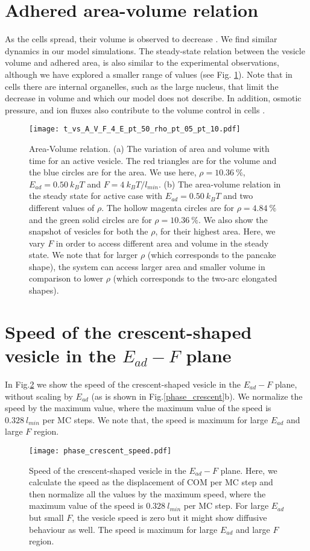 \documentclass[pre,amsmath]{revtex4}
\begin{document}
\section{Adhered area-volume relation}
\label{sec:volume}
As the cells spread, their volume is observed to decrease \cite{guo2017cell,xie2018controlling}. We find similar dynamics in our model simulations. The steady-state relation between the vesicle volume and adhered area, is also similar to the experimental observations, although we have explored a smaller range of values (see Fig. \ref{area_volume}). Note that in cells there are internal organelles, such as the large nucleus, that limit the decrease in volume and which our model does not describe. In addition, osmotic pressure, and ion fluxes also contribute to the volume control in cells \cite{adar2020active}. 
\begin{figure}[ht]
\centering
\texttt{[image: t\_vs\_A\_V\_F\_4\_E\_pt\_50\_rho\_pt\_05\_pt\_10.pdf]}
\caption{Area-Volume relation. (a) The variation of area and volume with time for an active vesicle. The red triangles are for the volume and the blue circles are for the area. We use here, $\rho=10.36 ~\%$, $E_{ad}=0.50 ~k_B T$ and $F=4 ~k_B T /l_{min}$. (b) The area-volume relation in the steady state for active case with $E_{ad}=0.50~ k_B T$ and two different values of $\rho$. The hollow magenta circles are for $\rho=4.84 ~\%$ and the green solid circles are for $\rho=10.36 ~\%$. We also show the snapshot of vesicles for both the $\rho$, for their highest area. Here, we vary $F$ in order to access different area and volume in the steady state.  We note that for larger $\rho$ (which corresponds to the pancake shape), the system can access larger area and smaller volume in comparison to lower $\rho$ (which corresponds to the two-arc elongated shapes).}
\label{area_volume} 
\end{figure}

\section{Speed of the crescent-shaped vesicle in the $E_{ad}-F$ plane }
\label{sec:crescent_speed}
In Fig.\ref{crescent_speed} we show the speed of the crescent-shaped vesicle in the $E_{ad}-F$ plane, without scaling by $E_{ad}$ (as is shown in Fig.\ref{phase_crescent}b). We normalize the speed by the maximum value, where the maximum value of the speed is $0.328 ~ l_{min}$ per MC steps. We note that, the speed is maximum for large $E_{ad}$ and large $F$ region.
\begin{figure}[ht]
\centering
\texttt{[image: phase\_crescent\_speed.pdf]}
\caption{Speed of the crescent-shaped vesicle in the $E_{ad}-F$ plane. Here, we calculate the speed as the displacement of COM per MC step and then normalize all the values by the maximum speed, where the maximum value of the speed is $0.328 ~ l_{min}$ per MC step. For large $E_{ad}$ but small $F$, the vesicle speed is zero but it might show diffusive behaviour as well. The speed is maximum for large $E_{ad}$ and large $F$ region.}
\label{crescent_speed} 
\end{figure}
\end{document}
